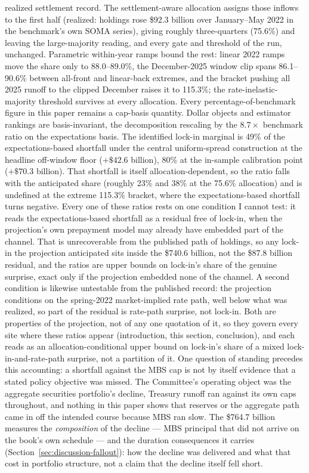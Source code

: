 \documentclass[12pt]{article}
\begin{document}
realized settlement record. The settlement-aware allocation assigns those inflows to the first half (realized: holdings rose \$92.3 billion over January--May 2022 in the benchmark's own SOMA series), giving roughly three-quarters (75.6\%) and leaving the large-majority reading, and every gate and threshold of the run, unchanged. Parametric within-year ramps bound the rest: linear 2022 ramps move the share only to 88.0--89.0\%, the December-2025 window clip spans 86.1--90.6\% between all-front and linear-back extremes, and the bracket pushing all 2025 runoff to the clipped December raises it to 115.3\%; the rate-inelastic-majority threshold survives at every allocation. Every percentage-of-benchmark figure in this paper remains a cap-basis quantity. Dollar objects and estimator rankings are basis-invariant, the decomposition rescaling by the $8.7\times$ benchmark ratio on the expectations basis. The identified lock-in marginal is 49\% of the expectations-based shortfall under the central uniform-spread construction at the headline off-window floor ($+\$42.6$ billion), 80\% at the in-sample calibration point ($+\$70.3$ billion). That shortfall is itself allocation-dependent, so the ratio falls with the anticipated share (roughly 23\% and 38\% at the 75.6\% allocation) and is undefined at the extreme 115.3\% bracket, where the expectations-based shortfall turns negative. Every one of these ratios rests on one condition I cannot test: it reads the expectations-based shortfall as a residual free of lock-in, when the projection's own prepayment model may already have embedded part of the channel. That is unrecoverable from the published path of holdings, so any lock-in the projection anticipated sits inside the \$740.6 billion, not the \$87.8 billion residual, and the ratios are upper bounds on lock-in's share of the genuine surprise, exact only if the projection embedded none of the channel. A second condition is likewise untestable from the published record: the projection conditions on the spring-2022 market-implied rate path, well below what was realized, so part of the residual is rate-path surprise, not lock-in. Both are properties of the projection, not of any one quotation of it, so they govern every site where these ratios appear (introduction, this section, conclusion), and each reads as an allocation-conditional upper bound on lock-in's share of a mixed lock-in-and-rate-path surprise, not a partition of it. One question of standing precedes this accounting: a shortfall against the MBS cap is not by itself evidence that a stated policy objective was missed. The Committee's operating object was the aggregate securities portfolio's decline, Treasury runoff ran against its own caps throughout, and nothing in this paper shows that reserves or the aggregate path came in off the intended course because MBS ran slow. The \$764.7 billion measures the \emph{composition} of the decline --- MBS principal that did not arrive on the book's own schedule --- and the duration consequences it carries (Section~\ref{sec:discussion-fallout}): how the decline was delivered and what that cost in portfolio structure, not a claim that the decline itself fell short.
\end{document}

